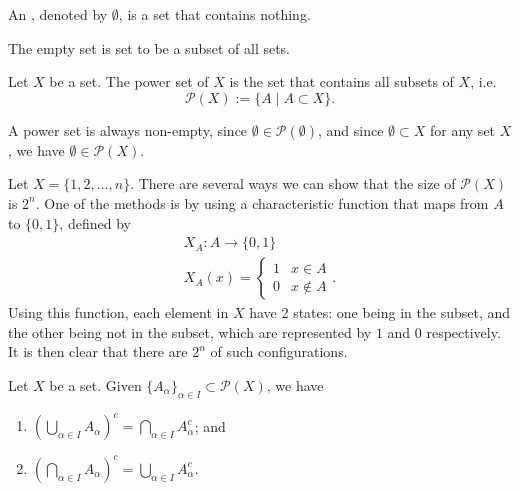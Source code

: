 \documentclass[notoc,notitlepage]{tufte-book}
\begin{document}
\begin{defn}
\label{defn:empty_set}
  An , denoted by $\emptyset$, is a set that contains nothing.
\end{defn}

\begin{note}
  The empty set is set to be a subset of all sets.
\end{note}

\begin{defn}
\label{defn:power_set}
  Let $X$ be a set. The power set of $X$ is the set that contains all subsets of $X$, i.e.
  \begin{equation*}
    \mathcal{P}(X) := \{ A \mid A \subset X \}.
  \end{equation*}
\end{defn}

\begin{note}
  A power set is always non-empty, since $\emptyset \in \mathcal{P}(\emptyset)$, and since $\emptyset \subset X$ for any set $X$, we have $\emptyset \in \mathcal{P}(X)$.
\end{note}

\begin{eg}
  Let $X = \{1, 2, ..., n\}$. There are several ways we can show that the size of $\mathcal{P}(X)$ is $2^n$. One of the methods is by using a characteristic function that maps from $A$ to $\{0, 1\}$, defined by
  \begin{gather*}
    X_A: A \to \{0, 1\} \\
    X_A(x) = \begin{cases}
      1 & x \in A \\
      0 & x \notin A
    \end{cases}.
  \end{gather*}
  Using this function, each element in $X$ have 2 states: one being in the subset, and the other being not in the subset, which are represented by $1$ and $0$ respectively. It is then clear that there are $2^n$ of such configurations.
\end{eg}

\begin{thm}
\label{thm:de_morgan_s_laws}
  Let $X$ be a set. Given $\{A_\alpha\}_{\alpha \in I} \subset \mathcal{P}(X)$, we have
  \begin{enumerate}
    \item $\left( \bigcup\limits_{\alpha \in I} A_\alpha \right)^c = \bigcap\limits_{\alpha \in I} A_\alpha^c$; and
    \item $\left( \bigcap\limits_{\alpha \in I} A_\alpha \right)^c = \bigcup\limits_{\alpha \in I} A_\alpha^c$.
  \end{enumerate}
\end{thm}
\end{document}
